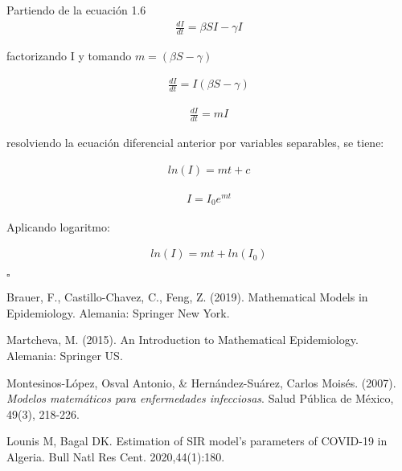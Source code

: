 \documentclass[a4paper,openany,12pt]{book}
\begin{document}
\begin{Dem}
Partiendo de la ecuación 1.6 
\begin{align*}
\frac{dI}{dt} = \beta SI - \gamma I
\end{align*}

factorizando I y tomando $m = \left(\beta S - \gamma \right)$

\begin{align*}
\frac{dI}{dt} = I \left( \beta S - \gamma \right)
\end{align*}

\begin{align*}
\frac{dI}{dt} = mI
\end{align*}

resolviendo la ecuación diferencial anterior por variables separables, se tiene:

\begin{align*}
ln(I) = mt + c
\end{align*}

\begin{align*}
I = I_{0} e^{mt} 
\end{align*}

Aplicando logaritmo:

\begin{align*}
ln(I) = mt + ln(I_{0})
\end{align*}

\hfill	$\square$

\end{Dem}


\begin{thebibliography}{4}

Brauer, F., Castillo-Chavez, C., Feng, Z. (2019). Mathematical Models in Epidemiology. Alemania: Springer New York.

Martcheva, M. (2015). An Introduction to Mathematical Epidemiology. Alemania: Springer US.

Montesinos-López, Osval Antonio, \& Hernández-Suárez, Carlos Moisés. (2007). \textit{Modelos matemáticos para enfermedades infecciosas}. Salud Pública de México, 49(3), 218-226.

Lounis M, Bagal DK. Estimation of SIR model's parameters of COVID-19 in Algeria. Bull Natl Res Cent. 2020,44(1):180.



\end{thebibliography}
\end{document}
